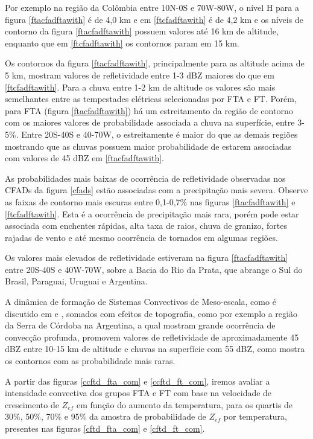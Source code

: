 Por exemplo na região da Colômbia entre 10N-0S e 70W-80W, o nível H para a figura \ref{ftacfadftawith} é de 4,0 km e em \ref{ftcfadftawith} é de 4,2 km e os níveis de contorno da figura \ref{ftacfadftawith} possuem valores até 16 km de altitude, enquanto que em \ref{ftcfadftawith} os contornos param em 15 km. 

Os contornos da figura \ref{ftacfadftawith}, principalmente para as altitude acima de 5 km, mostram valores de refletividade entre 1-3 dBZ  maiores do que em \ref{ftcfadftawith}. Para a chuva entre 1-2 km de altitude os valores são mais semelhantes entre as tempestades elétricas selecionadas por FTA e FT. Porém, para FTA (figura \ref{ftacfadftawith}) há um estreitamento da região de contorno com os maiores valores de probabilidade associada a chuva na superfície, entre 3-5\%. Entre 20S-40S e 40-70W, o estreitamente é maior do que as demais regiões mostrando que as chuvas possuem maior probabilidade de estarem associadas com valores de 45 dBZ em \ref{ftacfadftawith}.      

As probabilidades mais baixas de ocorrência de refletividade observadas nos CFADs da figura \ref{cfads} estão associadas com a precipitação mais severa. Observe as faixas de contorno mais escuras entre 0,1-0,7\% nas figuras \ref{ftacfadftawith} e \ref{ftcfadftawith}. Esta é a ocorrência de precipitação mais rara, porém pode estar associada com enchentes rápidas, alta taxa de raios, chuva de granizo, fortes rajadas de vento e até mesmo ocorrência de tornados em algumas regiões. 

Os valores mais elevados de refletividade estiveram na figura \ref{ftacfadftawith} entre 20S-40S e 40W-70W, sobre a Bacia do Rio da Prata, que abrange o Sul do Brasil, Paraguai, Uruguai e Argentina. 

A dinâmica de formação de Sistemas Convectivos de Meso-escala, como é discutido em \cite{Velasco1987} e \cite{Durkee2009}, somados com efeitos de topografia, como por exemplo a região da Serra de Córdoba na Argentina, a qual \cite{Rasmussen2011} mostram grande ocorrência de convecção profunda, promovem valores de refletividade de aproximadamente 45 dBZ entre 10-15 km de altitude e chuvas na superfície com 55 dBZ, como mostra os contornos com as probabilidade mais raras.

\hline



A partir das figuras \ref{ccftd_fta_com} e \ref{ccftd_ft_com}, iremos avaliar a intensidade convectiva dos grupos FTA e FT com base na velocidade de crescimento de $Z_{ef}$ em função do aumento da temperatura, para os quartis de 30\%, 50\%, 70\% e 95\% da amostra de probabilidade de $Z_{ef}$ por temperatura, presentes nas figuras \ref{cftd_fta_com} e \ref{cftd_ft_com}.

